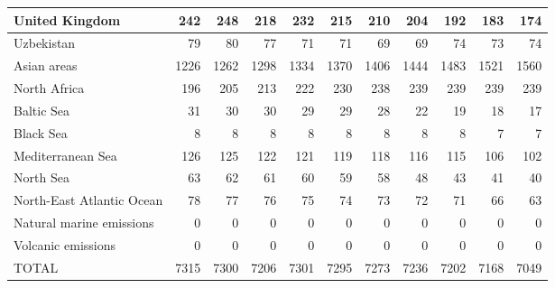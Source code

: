 \begin{table}
\begin{tabular}{|l|r|r|r|r|r|r|r|r|r|r|}
                United Kingdom&    242&    248&    218&    232&    215&    210&    204&    192&    183&    174\\\hline
                    Uzbekistan&     79&     80&     77&     71&     71&     69&     69&     74&     73&     74\\\hline
                   Asian areas&   1226&   1262&   1298&   1334&   1370&   1406&   1444&   1483&   1521&   1560\\\hline
                  North Africa&    196&    205&    213&    222&    230&    238&    239&    239&    239&    239\\\hline
                    Baltic Sea&     31&     30&     30&     29&     29&     28&     22&     19&     18&     17\\\hline
                     Black Sea&      8&      8&      8&      8&      8&      8&      8&      8&      7&      7\\\hline
             Mediterranean Sea&    126&    125&    122&    121&    119&    118&    116&    115&    106&    102\\\hline
                     North Sea&     63&     62&     61&     60&     59&     58&     48&     43&     41&     40\\\hline
     North-East Atlantic Ocean&     78&     77&     76&     75&     74&     73&     72&     71&     66&     63\\\hline
      Natural marine emissions&      0&      0&      0&      0&      0&      0&      0&      0&      0&      0\\\hline
            Volcanic emissions&      0&      0&      0&      0&      0&      0&      0&      0&      0&      0\\\hline\hline
                         TOTAL&   7315&   7300&   7206&   7301&   7295&   7273&   7236&   7202&   7168&   7049\\\hline
 \end{tabular}
 \end{table}
 

